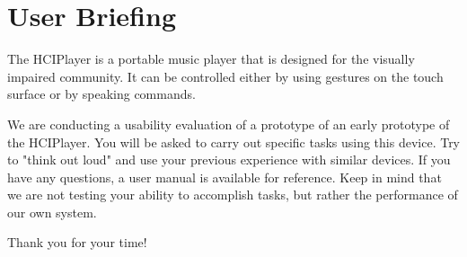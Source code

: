 \documentclass[12pt,letterpaper]{article}
\begin{document}
\section{User Briefing}

The HCIPlayer is a portable music player that is designed for the visually impaired community. It can be controlled either by using gestures on the touch surface or by speaking commands.

We are conducting a usability evaluation of a prototype of an early prototype of the HCIPlayer. You will be asked to carry out specific tasks using this device. Try to "think out loud" and use your previous experience with similar devices. If you have any questions, a user manual is available for reference. Keep in mind that we are not testing your ability to accomplish tasks, but rather the performance of our own system.

Thank you for your time!
\end{document}

